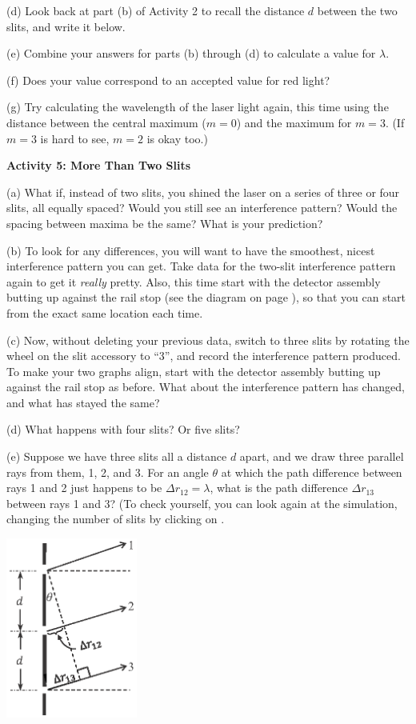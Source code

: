(d) Look back at part (b) of Activity 2 to recall the distance $d$ between the two slits, and write it below.
\answerspace{0.3in}

(e) Combine your answers for parts (b) through (d) to calculate a value for $\lambda$.  
\answerspace{1in}

(f) Does your value correspond to an accepted value for red light?
\answerspace{0.3in}

(g) Try calculating the wavelength of the laser light again, this time using the distance between the central maximum ($m=0$) and the maximum for $m=3$.  (If $m=3$ is hard to see, $m=2$ is okay too.)
\answerspace{0.9in}


\pagebreak[2]
\textbf{Activity 5: More Than Two Slits}

(a) What if, instead of two slits, you shined the laser on a series of three or four slits, all equally spaced?  Would you still see an interference pattern?  Would the spacing between maxima be the same?  What is your prediction?
\answerspace{0.8in}

(b) To look for any differences, you will want to have the smoothest, nicest interference pattern you can get.  Take data for the two-slit interference pattern again to get it \textit{really} pretty.  Also, this time start with the detector assembly butting up against the rail stop (see the diagram on page \pageref{figure_rail_stop}), so that you can start from the exact same location each time.

(c) Now, without deleting your previous data, switch to three slits by rotating the wheel on the slit accessory 
to ``3'', and record the interference pattern produced.
To make your two graphs align, start with the detector assembly butting up against the rail stop as before.  
What about the interference pattern has changed, and what has stayed the same?
\answerspace{0.8in}

(d) What happens with four slits?  Or five slits?
\answerspace{0.8in}

(e) Suppose we have three slits all a distance $d$ apart, and we draw three parallel rays from them, 1, 2, and 3.  For an angle $\theta$ at which the path difference between rays 1 and 2 just happens to be $\Delta r_{12} = \lambda$, what is the path difference $\Delta r_{13}$ between rays 1 and 3?  (To check yourself, you can look again at the simulation, changing the number of slits by clicking on .

\hspace{0.5in}\includegraphics[width=1.7in]{interference_of_light/three_slits.eps}


